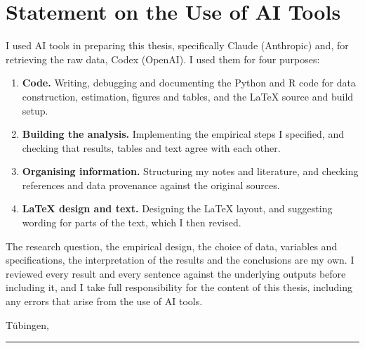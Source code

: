 \clearpage
\begingroup
{}
\pagestyle{empty}
\thispagestyle{empty}

\chapter*{Statement on the Use of AI Tools}
\thispagestyle{empty}

\noindent I used AI tools in preparing this thesis, specifically Claude (Anthropic) and, for retrieving the raw data, Codex (OpenAI). I used them for four purposes:

\begin{enumerate}[leftmargin=1.8em, itemsep=0.3em, topsep=0.5em]
  \item \textbf{Code.} Writing, debugging and documenting the Python and R code for data construction, estimation, figures and tables, and the LaTeX source and build setup.
  \item \textbf{Building the analysis.} Implementing the empirical steps I specified, and checking that results, tables and text agree with each other.
  \item \textbf{Organising information.} Structuring my notes and literature, and checking references and data provenance against the original sources.
  \item \textbf{LaTeX design and text.} Designing the LaTeX layout, and suggesting wording for parts of the text, which I then revised.
\end{enumerate}

\noindent The research question, the empirical design, the choice of data, variables and specifications, the interpretation of the results and the conclusions are my own. I reviewed every result and every sentence against the underlying outputs before including it, and I take full responsibility for the content of this thesis, including any errors that arise from the use of AI tools.

\vspace{2.4cm}

\noindent Tübingen, \ThesisDate

\vspace{1.8cm}

\noindent\rule{0.45\textwidth}{0.4pt}\\
\ThesisAuthor

